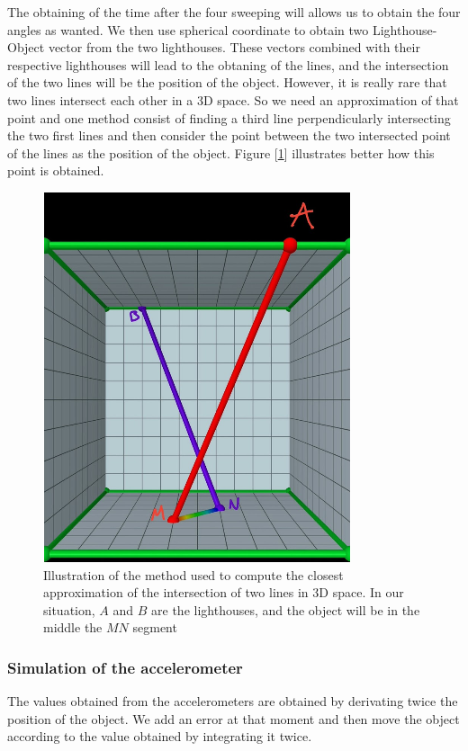 \documentclass{vldb}
\begin{document}
The obtaining of the time after the four sweeping will allows us to obtain the four angles as wanted. We then use spherical coordinate to obtain two Lighthouse-Object vector from the two lighthouses. These vectors combined with their respective lighthouses will lead to the obtaning of the lines, and the intersection of the two lines will be the position of the object. \newline
However, it is really rare that two lines intersect each other in a 3D space. So we need an approximation of that point and one method consist of finding a third line perpendicularly intersecting the two first lines and then consider the point between the two intersected point of the lines as the position of the object. Figure [\ref{im:intersection}] illustrates better how this point is obtained.

\begin{figure}[h!]
  \includegraphics[scale = 0.92]{Image/interscetion.png}
  \caption{Illustration of the method used to compute the closest approximation of the intersection of two lines in 3D space. In our situation, $A$ and $B$ are the lighthouses, and the object will be in the middle the $MN$ segment}
  \label{im:intersection}
\end{figure}


\subsubsection*{Simulation of the accelerometer}
The values obtained from the accelerometers are obtained by derivating twice the position of the object. We add an error at that moment and then move the object according to the value obtained by integrating it twice.
\end{document}
